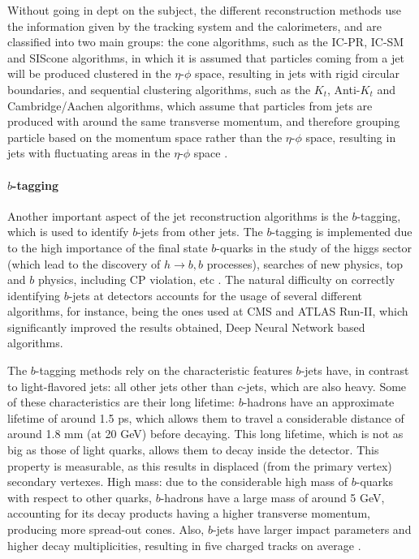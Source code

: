 Without going in dept on the subject, the different reconstruction methods use the information given by the tracking system and the calorimeters, and are classified into two main groups: the cone algorithms, such as the IC-PR, IC-SM and SIScone algorithms, in which it is assumed that particles coming from a jet will be produced clustered in the $\eta$-$\phi$ space, resulting in jets with rigid circular boundaries, and sequential clustering algorithms, such as the $K_t$, Anti-$K_t$ and Cambridge/Aachen algorithms, which assume that particles from jets are produced with around the same transverse momentum, and therefore grouping particle based on the momentum space rather than the $\eta$-$\phi$ space, resulting in jets with fluctuating areas in the $\eta$-$\phi$ space \cite{jets}.

\paragraph{$b$-tagging}

Another important aspect of the jet reconstruction algorithms is the $b$-tagging, which is used to identify $b$-jets from other jets. The $b$-tagging is implemented due to the high importance of the final state $b$-quarks in the study of the higgs sector (which lead to the discovery of $h \rightarrow b, b$ processes), searches of new physics, top and $b$ physics, including CP violation, etc \cite{b-tagging}. The natural difficulty on correctly identifying $b$-jets at detectors accounts for the usage of several different algorithms, for instance, being the ones used at CMS and ATLAS Run-II, which significantly improved the results obtained, Deep Neural Network based algorithms.

The $b$-tagging methods rely on the characteristic features $b$-jets have, in contrast to light-flavored jets: all other jets other than $c$-jets, which are also heavy. Some of these characteristics are their long lifetime: $b$-hadrons have an approximate lifetime of around 1.5 ps, which allows them to travel a considerable distance of around 1.8 mm (at 20 GeV) before decaying. This long lifetime, which is not as big as those of light quarks, allows them to decay inside the detector. This property is measurable, as this results in displaced (from the primary vertex) secondary vertexes. High mass: due to the considerable high mass of $b$-quarks with respect to other quarks, $b$-hadrons have a large mass of around 5 GeV, accounting for its decay products having a higher transverse momentum, producing more spread-out cones. Also, $b$-jets have larger impact parameters and higher decay multiplicities, resulting in five charged tracks on average \cite{b-tagging}.

